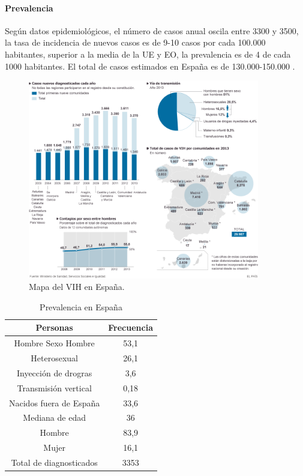 \documentclass[a4paper,twocolumn,10pt]{article}
\begin{document}
\paragraph{Prevalencia}
Según datos epidemiológicos, el número de casos anual oscila entre 3300 y 3500, la tasa de incidencia de nuevos casos es de 9-10 casos por cada 100.000 habitantes, superior a la media de la UE y EO, la prevalencia es de 4 de cada 1000 habitantes. El total de casos estimados en España es de 130.000-150.000 \cite{Molina2018}. 
\begin{figure}[htb]
\centering
\includegraphics[width=0.9\textwidth]{./sida}
\caption{Mapa del VIH en España.{\cite{Benito2014}}}
\label{fig: Map}
\end{figure}
\begin{table}[htbp]
\begin{center}
\begin{tabular}{|c|c|}
\hline 
{\cellcolor[gray]{0.7} \bfseries Personas} & {\cellcolor[gray]{0.7} \bfseries Frecuencia} \\ \hline 
Hombre Sexo Hombre & 53,1 \\ \hline
Heterosexual & 26,1 \\ \hline
Inyección de drogras & 3,6 \\ \hline
Transmisión vertical & 0,18 \\ \hline
Nacidos fuera de España & 33,6 \\ \hline
Mediana de edad & 36 \\ \hline
Hombre & 83,9 \\ \hline
Mujer & 16,1 \\ \hline 
Total de diagnosticados & 3353 \\ \hline 
\end{tabular}
\caption{Prevalencia en España \cite{Molina2018}}
\label{tabla:Prevalencia}
\end{center}
\end{table}
\end{document}
